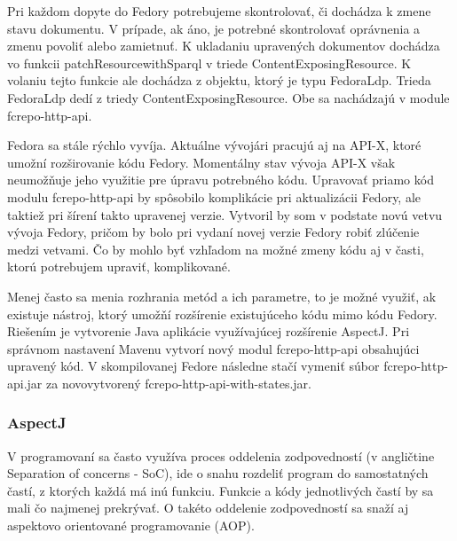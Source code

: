 \documentclass[thesis=M,slovak]{FITthesis}[2013/05/06]
\begin{document}
Pri každom dopyte do Fedory potrebujeme skontrolovať, či dochádza k zmene stavu dokumentu. V prípade, ak áno, je potrebné skontrolovať oprávnenia a zmenu povoliť alebo zamietnuť. K ukladaniu upravených dokumentov dochádza vo funkcii patchResourcewithSparql v triede ContentExposingResource.
K volaniu tejto funkcie ale dochádza z objektu, ktorý je typu FedoraLdp. Trieda FedoraLdp dedí z triedy ContentExposingResource. Obe sa nachádzajú v module fcrepo-http-api.

Fedora sa stále rýchlo vyvíja. Aktuálne vývojári pracujú aj na API-X, ktoré umožní rozširovanie kódu Fedory. Momentálny stav vývoja API-X však neumožňuje jeho využitie pre úpravu potrebného kódu. Upravovať priamo kód modulu fcrepo-http-api by spôsobilo komplikácie pri aktualizácii Fedory, ale taktiež pri šírení takto upravenej verzie. Vytvoril by som v podstate novú vetvu vývoja Fedory, pričom by bolo pri vydaní novej verzie Fedory robiť zlúčenie medzi vetvami. Čo by mohlo byť vzhľadom na možné zmeny kódu aj v časti, ktorú potrebujem upraviť, komplikované.

Menej často sa menia rozhrania metód a ich parametre, to je možné využiť, ak existuje nástroj, ktorý umožňí rozšírenie existujúceho kódu mimo kódu Fedory. Riešením je vytvorenie Java aplikácie využívajúcej rozšírenie AspectJ. Pri správnom nastavení Mavenu vytvorí nový modul fcrepo-http-api obsahujúci upravený kód. V skompilovanej Fedore následne stačí vymeniť súbor fcrepo-http-api.jar za novovytvorený fcrepo-http-api-with-states.jar.

\subsubsection{AspectJ}
V programovaní sa často využíva proces oddelenia zodpovedností (v angličtine Separation of concerns - SoC), ide o snahu rozdeliť program do samostatných častí, z ktorých každá má inú funkciu. Funkcie a kódy jednotlivých častí by sa mali čo najmenej prekrývať. O takéto oddelenie zodpovedností sa snaží aj aspektovo orientované programovanie (AOP).
\end{document}
